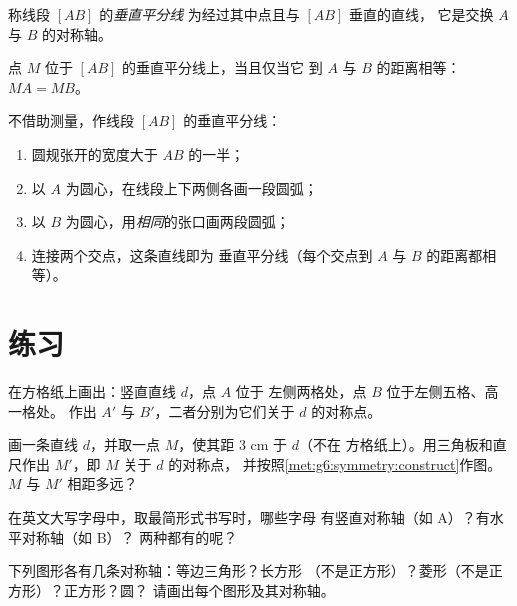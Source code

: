 \begin{definition}[垂直平分线]\label{def:g6:symmetry:bisector}
称线段 $[AB]$ 的\emph{垂直平分线}
为经过其中点且与 $[AB]$ 垂直的直线，
它是交换 $A$ 与 $B$ 的对称轴。
\end{definition}

\begin{proposition}[等距性]\label{prop:g6:symmetry:bisector}
点 $M$ 位于 $[AB]$ 的垂直平分线上，当且仅当它
到 $A$ 与 $B$ 的距离相等：$MA = MB$。
\end{proposition}
\admitted

\begin{method}[圆规作图]\label{met:g6:symmetry:bisector}
不借助测量，作线段 $[AB]$ 的垂直平分线：
\begin{enumerate}
  \item 圆规张开的宽度大于 $AB$ 的一半；
  \item 以 $A$ 为圆心，在线段上下两侧各画一段圆弧；
  \item 以 $B$ 为圆心，用\emph{相同}的张口画两段圆弧；
  \item 连接两个交点，这条直线即为
        垂直平分线（每个交点到 $A$ 与 $B$ 的距离都相等）。
\end{enumerate}
\end{method}

\section{练习}

\begin{exercise}[$\star$]\label{exo:g6:symmetry:1}
在方格纸上画出：竖直直线 $d$，点 $A$ 位于
左侧两格处，点 $B$ 位于左侧五格、高一格处。
作出 $A'$ 与 $B'$，二者分别为它们关于 $d$ 的对称点。
\end{exercise}

\begin{exercise}[$\star$]\label{exo:g6:symmetry:2}
画一条直线 $d$，并取一点 $M$，使其距 $3$ cm 于 $d$（不在
方格纸上）。用三角板和直尺作出 $M'$，即 $M$ 关于 $d$ 的对称点，
并按照\cref{met:g6:symmetry:construct}作图。
$M$ 与 $M'$ 相距多远？
\end{exercise}

\begin{exercise}[$\star$]\label{exo:g6:symmetry:3}
在英文大写字母中，取最简形式书写时，哪些字母
有竖直对称轴（如 A）？有水平对称轴（如 B）？
两种都有的呢？
\end{exercise}

\begin{exercise}[$\star$]\label{exo:g6:symmetry:4}
下列图形各有几条对称轴：等边三角形？长方形
（不是正方形）？菱形（不是正方形）？正方形？圆？
请画出每个图形及其对称轴。
\end{exercise}

